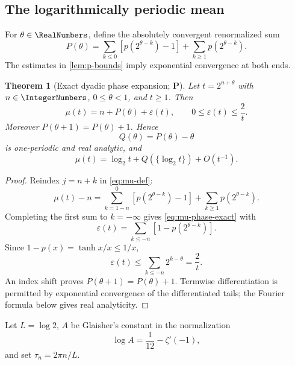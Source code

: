 \documentclass[11pt,oneside]{article}
\newtheorem{theorem}{Theorem}[section]
\theoremstyle{definition}
\theoremstyle{remark}
\newcommand{\statusP}{\textcolor{deepgreen}{\textbf{P}}}
\begin{document}
\subsection{The logarithmically periodic mean}

For $\theta\in\RealNumbers$, define the absolutely convergent renormalized sum
\begin{equation}
 P(\theta)=
 \sum_{k\le0}\left[p(2^{\theta-k})-1\right]
 +\sum_{k\ge1}p(2^{\theta-k}).
 \label{eq:P-theta}
\end{equation}
The estimates in \cref{lem:p-bounds} imply exponential convergence at both
ends.

\begin{theorem}[Exact dyadic phase expansion; \statusP]
\label{thm:mu-phase}
Let $t=2^{n+\theta}$ with $n\in\IntegerNumbers$, $0\le\theta<1$, and $t\ge1$.  Then
\begin{equation}
 \boxed{
 \mu(t)=n+P(\theta)+\varepsilon(t),
 \qquad 0\le\varepsilon(t)\le\frac2t.}
 \label{eq:mu-phase-exact}
\end{equation}
Moreover $P(\theta+1)=P(\theta)+1$.  Hence
\begin{equation}
 Q(\theta)=P(\theta)-\theta
 \label{eq:Q-def}
\end{equation}
is one-periodic and real analytic, and
\begin{equation}
 \boxed{
 \mu(t)=\log_2t+Q(\{\log_2t\})+O(t^{-1}).}
 \label{eq:mu-logperiodic}
\end{equation}
\end{theorem}

\begin{proof}
Reindex $j=n+k$ in \eqref{eq:mu-def}:
\[
 \mu(t)-n
 =\sum_{k=1-n}^0\left[p(2^{\theta-k})-1\right]
  +\sum_{k\ge1}p(2^{\theta-k}).
\]
Completing the first sum to $k=-\infty$ gives \eqref{eq:mu-phase-exact} with
\[
 \varepsilon(t)=\sum_{k\le-n}\left[1-p(2^{\theta-k})\right].
\]
Since $1-p(x)=\tanh x/x\le1/x$,
\[
 \varepsilon(t)\le\sum_{k\le-n}2^{k-\theta}=\frac2t.
\]
An index shift proves $P(\theta+1)=P(\theta)+1$.  Termwise differentiation is
permitted by exponential convergence of the differentiated tails; the Fourier
formula below gives real analyticity.
\end{proof}

Let $L=\log2$, $A$ be Glaisher's constant in the normalization
\begin{equation}
 \log A=\frac1{12}-\zeta'(-1),
 \label{eq:Glaisher}
\end{equation}
and set $\tau_n=2\pi n/L$.
\end{document}
